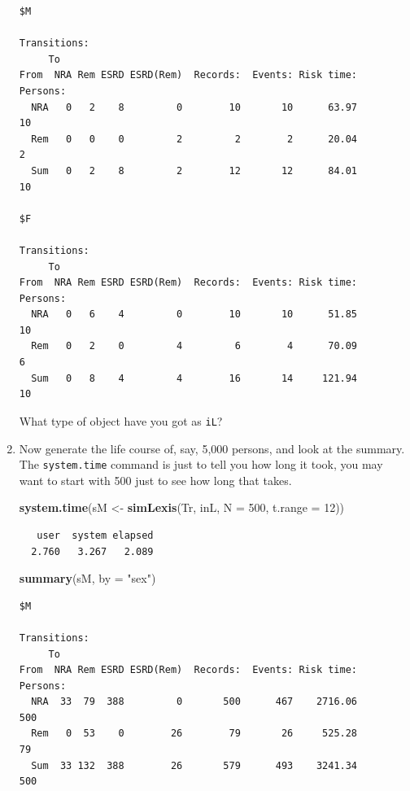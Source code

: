 \documentclass[
]{book}
\newenvironment{Shaded}{\begin{snugshade}}{\end{snugshade}}
\newcommand{\AttributeTok}[1]{\textcolor[rgb]{0.13,0.29,0.53}{#1}}
\newcommand{\DecValTok}[1]{\textcolor[rgb]{0.00,0.00,0.81}{#1}}
\newcommand{\FunctionTok}[1]{\textcolor[rgb]{0.13,0.29,0.53}{\textbf{#1}}}
\newcommand{\NormalTok}[1]{#1}
\newcommand{\OtherTok}[1]{\textcolor[rgb]{0.56,0.35,0.01}{#1}}
\newcommand{\StringTok}[1]{\textcolor[rgb]{0.31,0.60,0.02}{#1}}
\begin{document}
\begin{enumerate}
\begin{verbatim}
$M

Transitions:
     To
From  NRA Rem ESRD ESRD(Rem)  Records:  Events: Risk time:  Persons:
  NRA   0   2    8         0        10       10      63.97        10
  Rem   0   0    0         2         2        2      20.04         2
  Sum   0   2    8         2        12       12      84.01        10

$F

Transitions:
     To
From  NRA Rem ESRD ESRD(Rem)  Records:  Events: Risk time:  Persons:
  NRA   0   6    4         0        10       10      51.85        10
  Rem   0   2    0         4         6        4      70.09         6
  Sum   0   8    4         4        16       14     121.94        10
\end{verbatim}

  What type of object have you got as \texttt{iL}?
\item
  Now generate the life course of, say, 5,000 persons, and look at the summary.
  The \texttt{system.time} command is just to tell you how long it
  took, you may want to start with 500 just to see how long that takes.

\begin{Shaded}
\begin{Highlighting}[]
\FunctionTok{system.time}\NormalTok{(sM }\OtherTok{\textless{}{-}} \FunctionTok{simLexis}\NormalTok{(Tr, inL, }\AttributeTok{N =} \DecValTok{500}\NormalTok{, }\AttributeTok{t.range =} \DecValTok{12}\NormalTok{))}
\end{Highlighting}
\end{Shaded}

\begin{verbatim}
   user  system elapsed 
  2.760   3.267   2.089 
\end{verbatim}

\begin{Shaded}
\begin{Highlighting}[]
\FunctionTok{summary}\NormalTok{(sM, }\AttributeTok{by =} \StringTok{"sex"}\NormalTok{)}
\end{Highlighting}
\end{Shaded}

\begin{verbatim}
$M

Transitions:
     To
From  NRA Rem ESRD ESRD(Rem)  Records:  Events: Risk time:  Persons:
  NRA  33  79  388         0       500      467    2716.06       500
  Rem   0  53    0        26        79       26     525.28        79
  Sum  33 132  388        26       579      493    3241.34       500


\end{verbatim}
\end{enumerate}
\end{document}
